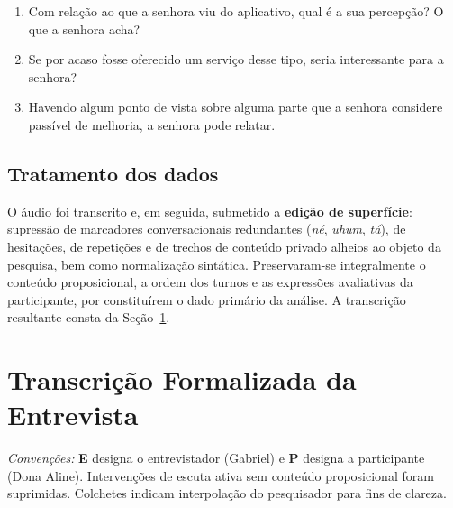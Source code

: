 \documentclass[12pt,a4paper]{article}
\newcommand{\entrevistador}{Gabriel}
\newcommand{\participante}{Dona Aline}
\begin{document}
\begin{enumerate}[label=\textbf{Q\arabic*.},leftmargin=1.6cm]
  \item Com relação ao que a senhora viu do aplicativo, qual é a sua percepção? O que a
        senhora acha?
  \item Se por acaso fosse oferecido um serviço desse tipo, seria interessante para a senhora?
  \item Havendo algum ponto de vista sobre alguma parte que a senhora considere passível de
        melhoria, a senhora pode relatar.
\end{enumerate}

\subsection{Tratamento dos dados}

O áudio foi transcrito e, em seguida, submetido a \textbf{edição de superfície}: supressão de
marcadores conversacionais redundantes (\textit{né}, \textit{uhum}, \textit{tá}), de
hesitações, de repetições e de trechos de conteúdo privado alheios ao objeto da pesquisa,
bem como normalização sintática. Preservaram-se integralmente o conteúdo proposicional, a
ordem dos turnos e as expressões avaliativas da participante, por constituírem o dado
primário da análise. A transcrição resultante consta da Seção~\ref{sec:transcricao}.

\section{Transcrição Formalizada da Entrevista}
\label{sec:transcricao}

\noindent\textit{Convenções:} \textbf{E} designa o entrevistador (\entrevistador{}) e
\textbf{P} designa a participante (\participante{}). Intervenções de escuta ativa sem
conteúdo proposicional foram suprimidas. Colchetes indicam interpolação do pesquisador para
fins de clareza.
\end{document}

